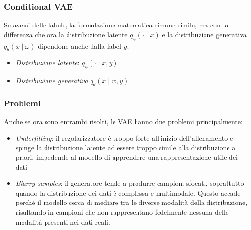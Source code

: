 \subsubsection{Conditional VAE}
Se avessi delle labels, la formulazione matematica rimane simile, ma con la differenza che ora la distribuzione latente $ q_\psi(\cdot \mid x) $ e la distribuzione generativa $ q_\theta(x \mid \omega) $ dipendono anche dalla label $ y $:
\begin{itemize}
	\item \textit{Distribuzione latente}: $ q_\psi\left(\cdot \mid x, y\right)  $
	\item \textit{Distribuzione generativa} $ q_\theta \left(x \mid w, y\right)  $
\end{itemize}
\subsubsection{Problemi}
Anche se ora sono entrambi risolti, le VAE hanno due problemi principalmente:
\begin{itemize}
	\item \textit{Underfitting}: il regolarizzatore è troppo forte all'inizio dell'allenamento e spinge la distribuzione latente ad essere troppo simile alla distribuzione a priori, impedendo al modello di apprendere una rappresentazione utile dei dati
	\item \textit{Blurry samples}: il generatore tende a produrre campioni sfocati, soprattutto quando la distribuzione dei dati è complessa e multimodale. Questo accade perché il modello cerca di mediare tra le diverse modalità della distribuzione, risultando in campioni che non rappresentano fedelmente nessuna delle modalità presenti nei dati reali.
\end{itemize}

